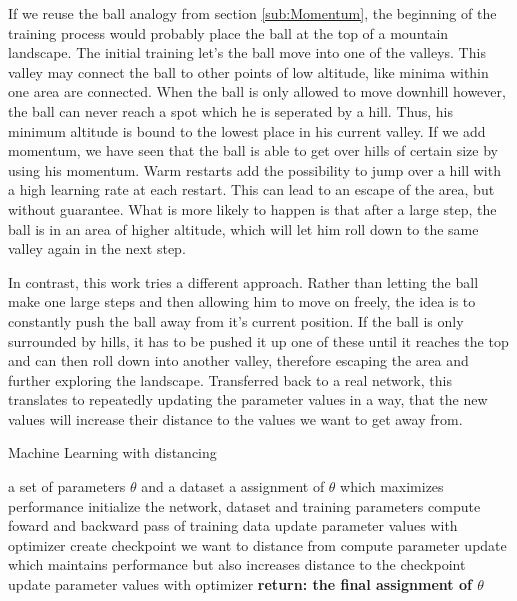 If we reuse the ball analogy from section \ref{sub:Momentum}, the beginning of
the training process would probably place the ball at the top of a mountain
landscape. The initial training let's the ball move into one of the valleys.
This valley may connect the ball to other points of low altitude, like minima
within one area are connected. When the ball is only allowed to move downhill
however, the ball can never reach a spot which he is seperated by a hill. Thus,
his minimum altitude is bound to the lowest place in his current valley. If we
add momentum, we have seen that the ball is able to get over hills of certain
size by using his momentum. Warm restarts add the possibility to jump over a
hill with a high learning rate at each restart. This can lead to an escape of
the area, but without guarantee. What is more likely to happen is that after a
large step, the ball is in an area of higher altitude, which will let him roll
down to the same valley again in the next step.

In contrast, this work tries a different approach. Rather than letting the ball
make one large steps and then allowing him to move on freely, the idea is to
constantly push the ball away from it's current position. If the ball is only
surrounded by hills, it has to be pushed it up one of these until it reaches the
top and can then roll down into another valley, therefore escaping the area and
further exploring the landscape. Transferred back to a real network, this
translates to repeatedly updating the parameter values in a way, that the new
values will increase their distance to the values we want to get away from.


\begin{algorithm}
    \begin{algorithmic}[1]
        \caption{Machine Learning with distancing}
        \REQUIRE a set of parameters $\theta$ and a dataset
        \ENSURE a assignment of $\theta$ which maximizes performance
        \STATE initialize the network, dataset and training parameters
            \STATE compute foward and backward pass of training data
            \STATE update parameter values with optimizer
        \ENDFOR
        \STATE create checkpoint we want to distance from
			\STATE compute parameter update which maintains performance but also increases distance to the checkpoint
			\ENDFOR
		\STATE update parameter values with optimizer
        \ENDFOR
        \STATE \textbf{return: the final assignment of $\theta$}
    \end{algorithmic}
    \label{alg:Distance_Motivation}
\end{algorithm}

